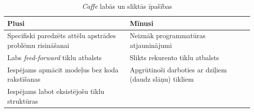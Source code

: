	\begin{table}[ht!]	
		\centering
		\begin{tabular}{ |p{8cm}|p{7cm}| }
			\hline
			\textbf{Plusi} & \textbf{Mīnusi}\\ \hline
			Specifiski paredzēts attēlu apstrādes problēmu risināšanai & Neiznāk programmatūras atjauninājumi \\ \hline 
			Labs \textit{feed-forward} tīklu atbalsts  & Slikts rekurento tīklu atbalsts \\ \hline
			Iespējams apmācīt modeļus bez koda rakstīšanas  &  Apgrūtinoši darboties ar dziļiem (daudz slāņu) tīkliem\\  \hline
			Iespējams labot eksistējošu tīklu struktūras  & \\ \hline
		\end{tabular}
		\caption{\textit{Caffe} labās un sliktās īpašības}
	\end{table}


